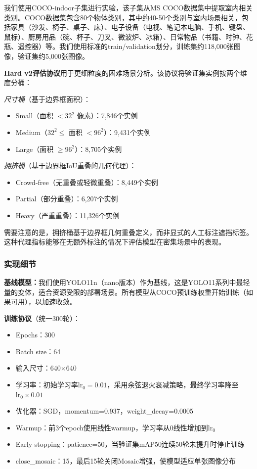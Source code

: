 \documentclass[journal]{IEEEtran}
\begin{document}
我们使用COCO-indoor子集进行实验，该子集从MS COCO数据集\cite{lin2014microsoft}中提取室内相关类别。COCO数据集包含80个物体类别，其中约40-50个类别与室内场景相关，包括家具（沙发、椅子、桌子、床）、电子设备（电视、笔记本电脑、手机、键盘、鼠标）、厨房用品（碗、杯子、刀叉、微波炉、冰箱）、日常物品（书籍、时钟、花瓶、遥控器）等。我们使用标准的train/validation划分，训练集约118,000张图像，验证集约5,000张图像。

\textbf{Hard v2评估协议}用于更细粒度的困难场景分析。该协议将验证集实例按两个维度分桶：

\textit{尺寸桶}（基于边界框面积）：
\begin{itemize}
    \item Small（面积 $< 32^2$ 像素）：7,846个实例
    \item Medium（$32^2 \leq$ 面积 $< 96^2$）：9,431个实例
    \item Large（面积 $\geq 96^2$）：8,705个实例
\end{itemize}

\textit{拥挤桶}（基于边界框IoU重叠的几何代理）：
\begin{itemize}
    \item Crowd-free（无重叠或轻微重叠）：8,449个实例
    \item Partial（部分重叠）：6,207个实例
    \item Heavy（严重重叠）：11,326个实例
\end{itemize}

需要注意的是，拥挤桶基于边界框几何重叠定义，而非显式的人工标注遮挡标签。这种代理指标能够在无额外标注的情况下评估模型在密集场景中的表现。

\subsubsection{实现细节}

\textbf{基线模型：}我们使用YOLO11n（nano版本）作为基线，这是YOLO11系列中最轻量的变体，适合资源受限的部署场景。所有模型从COCO预训练权重开始训练（如果可用），以加速收敛。

\textbf{训练协议}（统一300轮）：
\begin{itemize}
    \item Epochs：300
    \item Batch size：64
    \item 输入尺寸：640$\times$640
    \item 学习率：初始学习率$\text{lr}_0=0.01$，采用余弦退火衰减策略，最终学习率降至$\text{lr}_0 \times 0.01$
    \item 优化器：SGD，momentum=0.937，weight\_decay=0.0005
    \item Warmup：前3个epoch使用线性warmup，学习率从0线性增加到$\text{lr}_0$
    \item Early stopping：patience=50，当验证集mAP50连续50轮未提升时停止训练
    \item close\_mosaic：15，最后15轮关闭Mosaic增强，使模型适应单张图像分布
\end{itemize}
\end{document}
